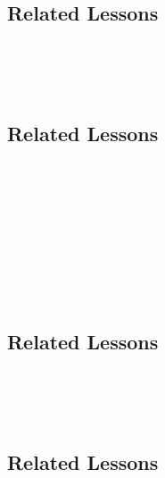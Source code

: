 \subsection{Related Lessons}
\fourFKFourteen{}\\
\fourFKFifteen{}\\
\fourFKSixteen{}\\
%
\subsection{Related Lessons}
\fourFKTen{}\\
\fourFKThirteen{}\\
\fourFKFifteen{}\\
\fourFKSixteen{}\\
\fourFKSeventeen{}\\
\fourFKTwentyFour{}\\
\fourFKTwentySix{}\\
\fourFKThirtyFive{}\\
%
\subsection{Related Lessons}
\fourFKFifteen{}\\
\fourFKThirtyOne{}\\
\fourFKThirtyThree{}\\
%
\subsection{Related Lessons}
\fourgTwo{}\\
\fourgFive{}\\
\fourFKSeven{}\\
\fourFKThirteen{}\\
\fourFKFourteen{}\\
\fourFKFifteen{}\\
\fourFKSixteen{}
